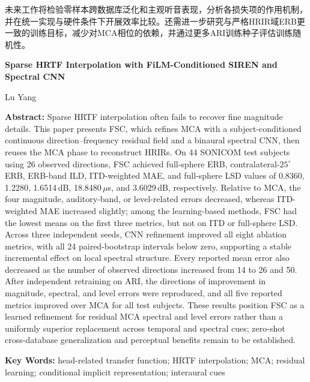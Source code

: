 \documentclass[UTF8,a4paper]{article}
\newenvironment{eAbstract}{\par\noindent\sffamily\small{\bfseries Abstract: }}{\par}
\newenvironment{eKeywords}{\par\smallskip\noindent\sffamily\small{\bfseries Key Words: }}{\par}
\begin{document}
未来工作将检验零样本跨数据库泛化和主观听音表现，分析各损失项的作用机制，并在统一实现与硬件条件下开展效率比较。还需进一步研究与严格HRIR域ERB更一致的训练目标，减少对MCA相位的依赖，并通过更多ARI训练种子评估训练随机性。



\clearpage
\begin{center}
{\normalsize\bfseries Sparse HRTF Interpolation with FiLM-Conditioned SIREN and Spectral CNN\par}
\smallskip
{\small Lu Yang\par}
\end{center}

\begin{eAbstract}
Sparse HRTF interpolation often fails to recover fine magnitude details. This paper presents FSC, which refines MCA with a subject-conditioned continuous direction--frequency residual field and a binaural spectral CNN, then reuses the MCA phase to reconstruct HRIRs. On 44 SONICOM test subjects using 26 observed directions, FSC achieved full-sphere ERB, contralateral-$25^\circ$ ERB, ERB-band ILD, ITD-weighted MAE, and full-sphere LSD values of 0.8360, 1.2280, 1.6514\,dB, 18.8480\,$\mu$s, and 3.6029\,dB, respectively. Relative to MCA, the four magnitude, auditory-band, or level-related errors decreased, whereas ITD-weighted MAE increased slightly; among the learning-based methods, FSC had the lowest means on the first three metrics, but not on ITD or full-sphere LSD. Across three independent seeds, CNN refinement improved all eight ablation metrics, with all 24 paired-bootstrap intervals below zero, supporting a stable incremental effect on local spectral structure. Every reported mean error also decreased as the number of observed directions increased from 14 to 26 and 50. After independent retraining on ARI, the directions of improvement in magnitude, spectral, and level errors were reproduced, and all five reported metrics improved over MCA for all test subjects. These results position FSC as a learned refinement for residual MCA spectral and level errors rather than a uniformly superior replacement across temporal and spectral cues; zero-shot cross-database generalization and perceptual benefits remain to be established.
\end{eAbstract}

\begin{eKeywords}
head-related transfer function; HRTF interpolation; MCA; residual learning; conditional implicit representation; interaural cues
\end{eKeywords}
\end{document}
